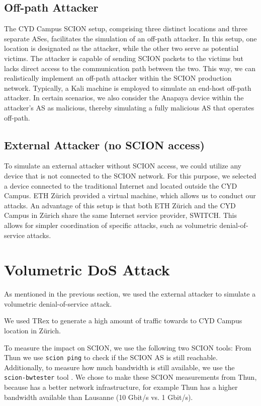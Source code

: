 \subsection{Off-path Attacker}

The CYD Campus SCION setup, comprising three distinct locations and three separate ASes, facilitates the simulation of an off-path attacker.
In this setup, one location is designated as the attacker, while the other two serve as potential victims.
The attacker is capable of sending SCION packets to the victims but lacks direct access to the communication path between the two.
This way, we can realistically implement an off-path attacker within the SCION production network.
Typically, a Kali machine is employed to simulate an end-host off-path attacker.
In certain scenarios, we also consider the Anapaya device within the attacker's AS as malicious, thereby simulating a fully malicious AS that operates off-path.

\subsection{External Attacker (no SCION access)}
To simulate an external attacker without SCION access, we could utilize any device that is not connected to the SCION network.
For this purpose, we selected a device connected to the traditional Internet and located outside the CYD Campus.
ETH Zürich provided a virtual machine, which allows us to conduct our attacks.
An advantage of this setup is that both ETH Zürich and the CYD Campus in Zürich share the same Internet service provider, SWITCH.
This allows for simpler coordination of specific attacks, such as volumetric denial-of-service attacks.


\section{Volumetric DoS Attack}
\label{sec:impl:VolumetricDoS}
As mentioned in the previous section, we used the external attacker to simulate a volumetric denial-of-service attack.

We used TRex  to generate a high amount of traffic towards to CYD Campus location in Zürich.

To measure the impact on SCION, we use the following two SCION tools:
From Thun we use \texttt{scion ping} to check if the SCION AS is still reachable.
Additionally, to measure how much bandwidth is still available, we use the \texttt{scion-bwtester} tool \cite{Scionappsbwtester}.
We chose to make these SCION measurements from Thun, because has a better network infrastructure, for example Thun has a higher bandwidth available than Lausanne (10 Gbit/s vs. 1 Gbit/s).

